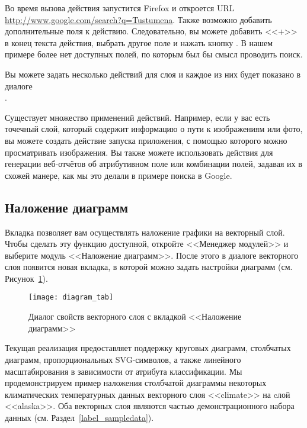 Во время вызова действия запустится Firefox и откроется URL
\url{http://www.google.com/search?q=Tustumena}. Также возможно добавить
дополнительные поля к действию. Следовательно, вы можете добавить <<+>>
в конец текста действия, выбрать другое поле и нажать кнопку
. В нашем примере более нет доступных полей, по которым
был бы смысл проводить поиск.

Вы можете задать несколько действий для слоя и каждое из них будет показано в
диалоге \\
.

Существует множество применений действий. Например, если у вас есть точечный
слой, который содержит информацию о пути к изображениям или фото, вы можете
создать действие запуска приложения, с помощью которого можно просматривать
изображения. Вы также можете использовать действия для генерации веб-отчётов
об атрибутивном поле или комбинации полей, задавая их в схожей манере, как
мы это делали в примере поиска в Google.

\subsection{Наложение диаграмм}\label{sec:diagram}

Вкладка  позволяет вам осуществлять наложение графики на
векторный слой. Чтобы сделать эту функцию доступной, откройте <<Менеджер модулей>>
и выберите модуль <<Наложение диаграмм>>. После этого в диалоге 
векторного слоя появится новая вкладка, в которой можно задать настройки диаграмм
(см. Рисунок~\ref{fig:diagramtab}).

\begin{figure}[ht]
   \centering
   \texttt{[image: diagram\_tab]}
   \caption{Диалог свойств векторного слоя с вкладкой <<Наложение диаграмм>> \wincaption}\label{fig:diagramtab}
\end{figure}

Текущая реализация предоставляет поддержку круговых диаграмм,
столбчатых диаграмм, пропорциональных SVG-символов, а также линейного масштабирования в зависимости
от атрибута классификации. Мы продемонстрируем пример наложения
столбчатой диаграммы некоторых климатических температурных данных
векторного слоя <<climate>> на cлой <<alaska>>.
Оба векторных слоя являются частью демонстрационного набора данных \qg
(см. Раздел~\ref{label_sampledata}).

